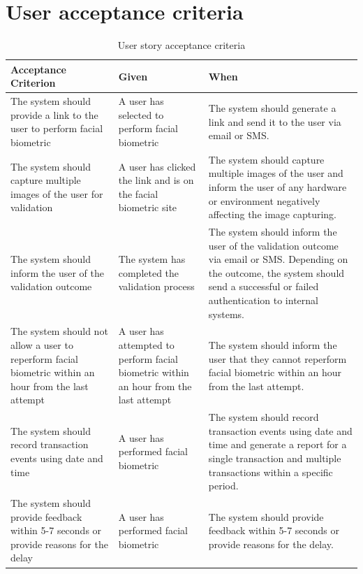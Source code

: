 \documentclass{article}
\begin{document}
 \section{User acceptance criteria}
 \begin{table}[h]
    \caption{User story acceptance criteria}
    \centering
    \begin{tabular}{|p{3cm}|p{5cm}|p{5cm}|}
        \hline
        \textbf{Acceptance Criterion} & \textbf{Given} & \textbf{When} \\
        \hline
        The system should provide a link to the user to perform facial biometric & 
        A user has selected to perform facial biometric &
         The system should generate a link and send it to the user via email or SMS.\\
        \hline
        The system should capture multiple images of the user for validation &
        A user has clicked the link and is on the facial biometric site &
        The system should capture multiple images of the user and inform the user of any hardware or environment negatively affecting the image capturing.\\
        \hline
        The system should inform the user of the validation outcome &
        The system has completed the validation process &
        The system should inform the user of the validation outcome via email or SMS. Depending on the outcome, the system should send a successful or failed authentication to internal systems.\\
        \hline
        The system should not allow a user to reperform facial biometric within an hour from the last attempt &
        A user has attempted to perform facial biometric within an hour from the last attempt &
        The system should inform the user that they cannot reperform facial biometric within an hour from the last attempt.\\
        \hline
        The system should record transaction events using date and time &
        A user has performed facial biometric &
        The system should record transaction events using date and time and generate a report for a single transaction and multiple transactions within a specific period.\\
        \hline 
        The system should provide feedback within 5-7 seconds or provide reasons for the delay &
        A user has performed facial biometric &
        The system should provide feedback within 5-7 seconds or provide reasons for the delay.\\
        \hline

\end{tabular}
\end{table}
\end{document}
